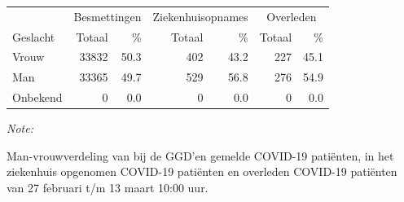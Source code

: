 \documentclass[
  english,
  man,floatsintext]{apa6}
\begin{document}
\begin{table}
\centering\begingroup\fontsize{11}{13}\selectfont

\begin{threeparttable}
\begin{tabular}{lrrrrrr}
\toprule
\multicolumn{1}{c}{ } & \multicolumn{2}{c}{Besmettingen} & \multicolumn{2}{c}{Ziekenhuisopnames} & \multicolumn{2}{c}{Overleden} \\
\cmidrule(l{3pt}r{3pt}){2-3} \cmidrule(l{3pt}r{3pt}){4-5} \cmidrule(l{3pt}r{3pt}){6-7}
Geslacht & Totaal & \% & Totaal & \% & Totaal & \%\\
\midrule
Vrouw & 33832 & 50.3 & 402 & 43.2 & 227 & 45.1\\
Man & 33365 & 49.7 & 529 & 56.8 & 276 & 54.9\\
Onbekend & 0 & 0.0 & 0 & 0.0 & 0 & 0.0\\
\bottomrule
\end{tabular}
\begin{tablenotes}
\item \textit{Note: } 
\item Man-vrouwverdeling van bij de GGD’en gemelde COVID-19 patiënten, in het ziekenhuis opgenomen COVID-19 patiënten en overleden COVID-19 patiënten van 27 februari t/m 13 maart 10:00 uur.
\end{tablenotes}
\end{threeparttable}
\endgroup{}
\end{table}
\newpage
\end{document}
